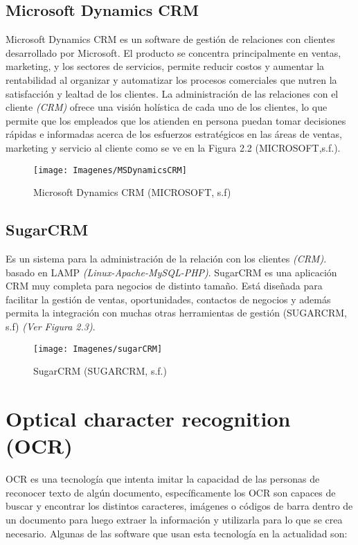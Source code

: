 	    \subsection{Microsoft Dynamics CRM}
		Microsoft Dynamics CRM es un software de gestión de relaciones con clientes desarrollado por Microsoft. El producto se concentra principalmente en ventas, marketing, y los sectores de servicios, permite reducir costos y aumentar la rentabilidad al organizar y automatizar los procesos comerciales que nutren la satisfacción y lealtad de los clientes. 
	    La administración de las relaciones con el cliente \textit{(CRM)} ofrece una visión holística de cada uno de los clientes, lo que permite que los empleados que los atienden en persona puedan tomar decisiones rápidas e informadas acerca de los esfuerzos estratégicos en las áreas de ventas, marketing y servicio al cliente como se ve en la Figura 2.2 (MICROSOFT,s.f.).
	    
	    \begin{figure}[H]
	    	\centering
	    	\texttt{[image: Imagenes/MSDynamicsCRM]}
	    	\caption{Microsoft Dynamics CRM (MICROSOFT, s.f)}
	    \end{figure}
	    
	    \subsection{SugarCRM}
	    Es un sistema para la administración de la relación con los clientes \textit{(CRM)}. basado en LAMP \textit{(Linux-Apache-MySQL-PHP)}. SugarCRM es una aplicación CRM muy completa para negocios de distinto tamaño. Está diseñada para facilitar la gestión de ventas, oportunidades, contactos de negocios y además permita la integración con muchas otras herramientas de gestión (SUGARCRM, s.f)  \textit{(Ver Figura 2.3)}.
	    
	    \begin{figure}[h]
	       	\centering
	       	\texttt{[image: Imagenes/sugarCRM]}
	       	\caption{SugarCRM (SUGARCRM, s.f.)}
	    \end{figure}
    
    \section{Optical character recognition (OCR)}
	OCR es una tecnología que intenta imitar la capacidad de las personas de reconocer texto de algún documento, específicamente los OCR son capaces de buscar y encontrar los distintos caracteres, imágenes o códigos de barra dentro de un documento para luego extraer la información y utilizarla para lo que se crea necesario. Algunas de las software que usan esta tecnología en la actualidad son:

